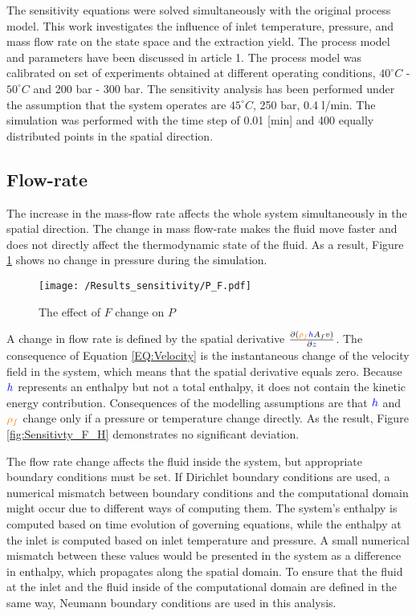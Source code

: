 \documentclass[../Article_Model_Parameters.tex]{subfiles}
\begin{document}
	
	\label{CH: Results}
	
	The sensitivity equations were solved simultaneously with the original process model. This work investigates the influence of inlet temperature, pressure, and mass flow rate on the state space and the extraction yield. The process model and parameters have been discussed in {\color{red}article 1}. The process model was calibrated on set of experiments obtained at different operating conditions, $40^\circ C$ - $50^\circ C$ and 200 bar - 300 bar. The sensitivity analysis has been performed under the assumption that the system operates are $45^\circ C$, 250 bar, 0.4 l/min. The simulation was performed with the time step of 0.01 [min] and 400 equally distributed points in the spatial direction.
	
	\subsection{Flow-rate}
	
	The increase in the mass-flow rate affects the whole system simultaneously in the spatial direction. The change in mass flow-rate makes the fluid move faster and does not directly affect the thermodynamic state of the fluid. As a result, Figure \ref{fig:Sensitivty_F_P} shows no change in pressure during the simulation. 
    
    \begin{figure}[h!]
    	\centering
    	\texttt{[image: /Results\_sensitivity/P\_F.pdf]}
    	\caption{The effect of $F$ change on $P$}
    	\label{fig:Sensitivty_F_P}
    \end{figure}
    
    A change in flow rate is defined by the spatial derivative $\frac{\partial \left( {\color{orange}\rho_f}{\color{blue}h} A_f v \right)}{\partial {\color{blue}z}}$. The consequence of Equation \ref{EQ:Velocity} is the instantaneous change of the velocity field in the system, which means that the spatial derivative equals zero. Because ${\color{blue}h}$ represents an enthalpy but not a total enthalpy, it does not contain the kinetic energy contribution. Consequences of the modelling assumptions are that ${\color{blue}h}$ and ${\color{orange}\rho_f}$ change only if a pressure or temperature change directly. As the result, Figure \ref{fig:Sensitivty_F_H} demonstrates no significant deviation.
    
    The flow rate change affects the fluid inside the system, but appropriate boundary conditions must be set. If Dirichlet boundary conditions are used, a numerical mismatch between boundary conditions and the computational domain might occur due to different ways of computing them. The system's enthalpy is computed based on time evolution of governing equations, while the enthalpy at the inlet is computed based on inlet temperature and pressure. A small numerical mismatch between these values would be presented in the system as a difference in enthalpy, which propagates along the spatial domain. To ensure that the fluid at the inlet and the fluid inside of the computational domain are defined in the same way, Neumann boundary conditions are used in this analysis.
        
\end{document}
